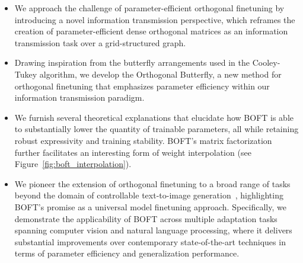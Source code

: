 \begin{itemize}[leftmargin=*,nosep]
    \item We approach the challenge of parameter-efficient orthogonal finetuning by introducing a novel information transmission perspective, which reframes the creation of parameter-efficient dense orthogonal matrices as an information transmission task over a grid-structured graph.
    \item Drawing inspiration from the butterfly arrangements used in the Cooley-Tukey algorithm, we develop the Orthogonal Butterfly, a new method for orthogonal finetuning that emphasizes parameter efficiency within our information transmission paradigm.
    \item We furnish several theoretical explanations that elucidate how BOFT is able to substantially lower the quantity of trainable parameters, all while retaining robust expressivity and training stability. BOFT’s matrix factorization further facilitates an interesting form of weight interpolation (see Figure~\ref{fig:boft_interpolation}).
    \item We pioneer the extension of orthogonal finetuning to a broad range of tasks beyond the domain of controllable text-to-image generation~\cite{qiu2023controlling}, highlighting BOFT’s promise as a universal model finetuning approach. Specifically, we demonstrate the applicability of BOFT across multiple adaptation tasks spanning computer vision and natural language processing, where it delivers substantial improvements over contemporary state-of-the-art techniques in terms of parameter efficiency and generalization performance.
\end{itemize}

